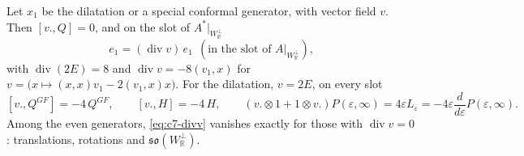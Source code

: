 \begin{proposition}
\label{prop:c7-dil}
Let $x_1$ be the dilatation or a special conformal generator, with vector field $v$. Then $[v.,Q]=0$, and on the slot of $A^*|_{W_{\mathbb R}^\perp}$
\begin{equation}
[v.,Q^{GF}]\,e_1=(\operatorname{div}v)\,e_1\ \ (\text{in the slot of }A|_{W_{\mathbb R}^\perp}),
\label{eq:c7-divv}
\end{equation}
with $\operatorname{div}(2E)=8$ and $\operatorname{div}v=-8(v_1,x)$ for $v=\big(x\mapsto(x,x)v_1-2(v_1,x)x\big)$. For the dilatation, $v=2E$, on every slot
\[
[v.,Q^{GF}]=-4\,Q^{GF},\qquad [v.,H]=-4\,H,\qquad (v.\otimes1+1\otimes v.)P(\varepsilon,\infty)=4\varepsilon L_\varepsilon=-4\varepsilon\frac{d}{d\varepsilon}P(\varepsilon,\infty).
\]
Among the even generators, \eqref{eq:c7-divv} vanishes exactly for those with $\operatorname{div}v=0$: translations, rotations and $\mathfrak{so}(W_{\mathbb R}^\perp)$.
\end{proposition}

